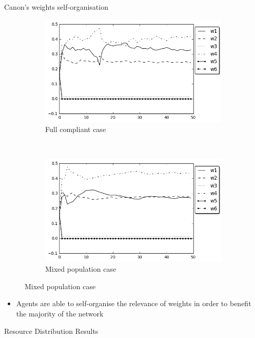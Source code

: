 \documentclass[xcolor={table}]{beamer}
\begin{document}
\begin{frame}[fragile=singleslide,t]
\begin{columns}[onlytextwidth,T]
\begin{column}{.48\textwidth}
\begin{block}{Canon's weights self-organisation}
\begin{figure}
\begin{subfigure}[b]{0.48\linewidth}
    \includegraphics[width=\linewidth]{pics/weights_exp0_lc.png}
    \caption{Full compliant case}
\end{subfigure}
~%
\begin{subfigure}[b]{0.49\linewidth}
    \includegraphics[width=\linewidth]{pics/weights_exp1_lc.png}
    \caption{Mixed population case}
\end{subfigure}
\end{figure}

\begin{itemize}
    \item Agents are able to self-organise the relevance of weights in order to benefit the majority of the network
\end{itemize}

\end{block}

\begin{block}{Resource Distribution Results}


\end{block}
\end{column}
\end{columns}
\end{frame}
\end{document}
